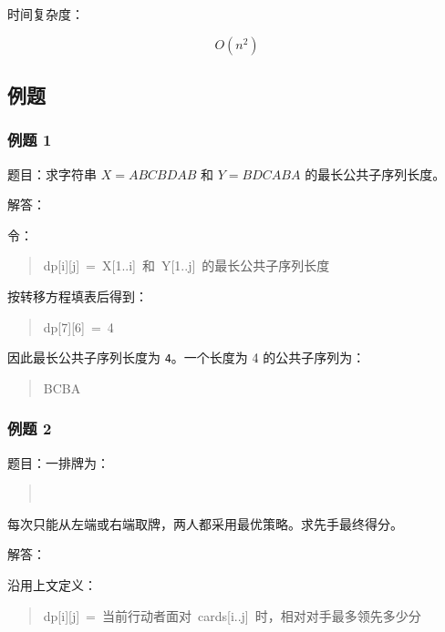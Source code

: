 \documentclass[UTF8,zihao=-4]{ctexart}
\begin{document}
时间复杂度：

\[O(n^{2})\]

\subsection*{例题}

\subsubsection*{例题 1}

题目：求字符串 $X = ABCBDAB$ 和 $Y = BDCABA$ 的最长公共子序列长度。

解答：

令：

\begin{quote}
\small\ttfamily\raggedright
\relax dp[i][j]\ =\ X[1..i]\ 和\ Y[1..j]\ 的最长公共子序列长度\\
\end{quote}

按转移方程填表后得到：

\begin{quote}
\small\ttfamily\raggedright
\relax dp[7][6]\ =\ 4\\
\end{quote}

因此最长公共子序列长度为 \texttt{4}。一个长度为 4 的公共子序列为：

\begin{quote}
\small\ttfamily\raggedright
\relax BCBA\\
\end{quote}

\subsubsection*{例题 2}

题目：一排牌为：

\begin{quote}
\small\ttfamily\raggedright
\relax [3,\ 9,\ 1,\ 2]\\
\end{quote}

每次只能从左端或右端取牌，两人都采用最优策略。求先手最终得分。

解答：

沿用上文定义：

\begin{quote}
\small\ttfamily\raggedright
\relax dp[i][j]\ =\ 当前行动者面对\ cards[i..j]\ 时，相对对手最多领先多少分\\
\end{quote}
\end{document}
